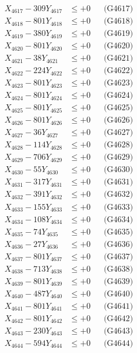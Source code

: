 \documentclass[a4paper,10pt]{article}
\begin{document}
{\begin{align}
X_{4617} - 309Y_{4617} &\leq +0 && \text{(G4617)} \\
X_{4618} - 801Y_{4618} &\leq +0 && \text{(G4618)} \\
X_{4619} - 380Y_{4619} &\leq +0 && \text{(G4619)} \\
X_{4620} - 801Y_{4620} &\leq +0 && \text{(G4620)} \\
\allowbreak
X_{4621} - 38Y_{4621} &\leq +0 && \text{(G4621)} \\
X_{4622} - 224Y_{4622} &\leq +0 && \text{(G4622)} \\
X_{4623} - 801Y_{4623} &\leq +0 && \text{(G4623)} \\
X_{4624} - 801Y_{4624} &\leq +0 && \text{(G4624)} \\
X_{4625} - 801Y_{4625} &\leq +0 && \text{(G4625)} \\
X_{4626} - 801Y_{4626} &\leq +0 && \text{(G4626)} \\
X_{4627} - 36Y_{4627} &\leq +0 && \text{(G4627)} \\
X_{4628} - 114Y_{4628} &\leq +0 && \text{(G4628)} \\
X_{4629} - 706Y_{4629} &\leq +0 && \text{(G4629)} \\
X_{4630} - 55Y_{4630} &\leq +0 && \text{(G4630)} \\
\allowbreak
X_{4631} - 317Y_{4631} &\leq +0 && \text{(G4631)} \\
X_{4632} - 391Y_{4632} &\leq +0 && \text{(G4632)} \\
X_{4633} - 155Y_{4633} &\leq +0 && \text{(G4633)} \\
X_{4634} - 108Y_{4634} &\leq +0 && \text{(G4634)} \\
X_{4635} - 74Y_{4635} &\leq +0 && \text{(G4635)} \\
X_{4636} - 27Y_{4636} &\leq +0 && \text{(G4636)} \\
X_{4637} - 801Y_{4637} &\leq +0 && \text{(G4637)} \\
X_{4638} - 713Y_{4638} &\leq +0 && \text{(G4638)} \\
X_{4639} - 801Y_{4639} &\leq +0 && \text{(G4639)} \\
X_{4640} - 487Y_{4640} &\leq +0 && \text{(G4640)} \\
\allowbreak
X_{4641} - 801Y_{4641} &\leq +0 && \text{(G4641)} \\
X_{4642} - 801Y_{4642} &\leq +0 && \text{(G4642)} \\
X_{4643} - 230Y_{4643} &\leq +0 && \text{(G4643)} \\
X_{4644} - 594Y_{4644} &\leq +0 && \text{(G4644)} \\

\end{align}}
\end{document}
